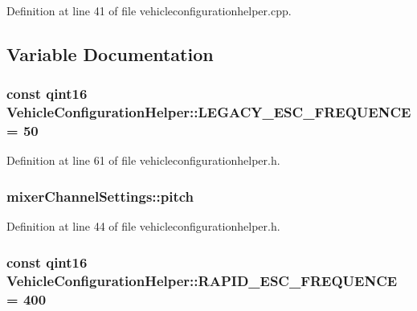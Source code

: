 Definition at line 41 of file vehicleconfigurationhelper.\-cpp.



\subsection{Variable Documentation}
\hypertarget{group___vehicle_configuration_helper_ga1ab33357e7669d7825cadb88ff666f98}{
\subsubsection[{L\-E\-G\-A\-C\-Y\-\_\-\-E\-S\-C\-\_\-\-F\-R\-E\-Q\-U\-E\-N\-C\-E}]{\setlength{\rightskip}{0pt plus 5cm}const qint16 Vehicle\-Configuration\-Helper\-::\-L\-E\-G\-A\-C\-Y\-\_\-\-E\-S\-C\-\_\-\-F\-R\-E\-Q\-U\-E\-N\-C\-E = 50\hspace{0.3cm}{\ttfamily [static]}}}\label{group___vehicle_configuration_helper_ga1ab33357e7669d7825cadb88ff666f98}


Definition at line 61 of file vehicleconfigurationhelper.\-h.

\hypertarget{group___vehicle_configuration_helper_gac604b2322be856866e658f6fba34c7f7}{
\subsubsection[{pitch}]{ mixer\-Channel\-Settings\-::pitch}}\label{group___vehicle_configuration_helper_gac604b2322be856866e658f6fba34c7f7}


Definition at line 44 of file vehicleconfigurationhelper.\-h.

\hypertarget{group___vehicle_configuration_helper_ga5bdfa86a19f74eae8f6b44ac63d640f2}{
\subsubsection[{R\-A\-P\-I\-D\-\_\-\-E\-S\-C\-\_\-\-F\-R\-E\-Q\-U\-E\-N\-C\-E}]{\setlength{\rightskip}{0pt plus 5cm}const qint16 Vehicle\-Configuration\-Helper\-::\-R\-A\-P\-I\-D\-\_\-\-E\-S\-C\-\_\-\-F\-R\-E\-Q\-U\-E\-N\-C\-E = 400\hspace{0.3cm}{\ttfamily [static]}}}\label{group___vehicle_configuration_helper_ga5bdfa86a19f74eae8f6b44ac63d640f2}


